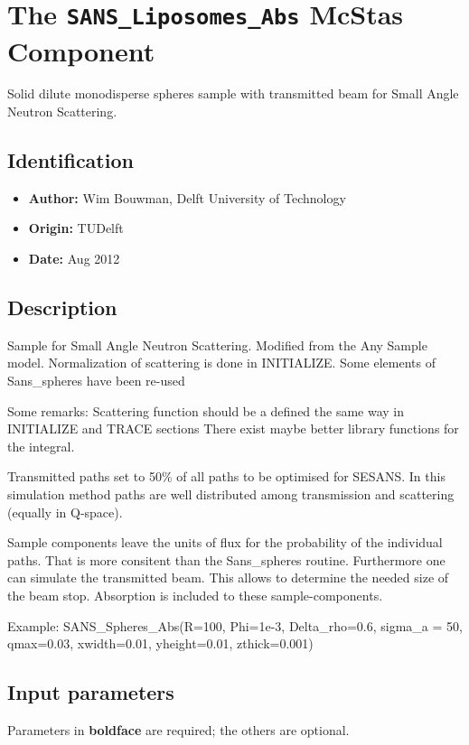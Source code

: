 \section{The \texttt{SANS\_Liposomes\_Abs} McStas Component}
Solid dilute monodisperse spheres sample with transmitted beam for Small Angle Neutron Scattering.

\subsection*{Identification}
\begin{itemize}
  \item \textbf{Author:} Wim Bouwman, Delft University of Technology
  \item \textbf{Origin:} TUDelft
  \item \textbf{Date:} Aug 2012
\end{itemize}

\subsection*{Description}
Sample for Small Angle Neutron Scattering. Modified from the Any Sample model. Normalization of scattering is done in INITIALIZE. Some elements of Sans\_spheres have been re-used

Some remarks: Scattering function should be a defined the same way in INITIALIZE and TRACE sections There exist maybe better library functions for the integral.

Transmitted paths set to 50\% of all paths to be optimised for SESANS. In this simulation method paths are well distributed among transmission and scattering (equally in Q-space).

Sample components leave the units of flux for the probability of the individual paths. That is more consitent than the Sans\_spheres routine. Furthermore one can simulate the transmitted beam. This allows to determine the needed size of the beam stop. Absorption is included to these sample-components.

Example: SANS\_Spheres\_Abs(R=100, Phi=1e-3, Delta\_rho=0.6, sigma\_a = 50, qmax=0.03, xwidth=0.01, yheight=0.01, zthick=0.001)

\subsection*{Input parameters}
Parameters in \textbf{boldface} are required; the others are optional.

